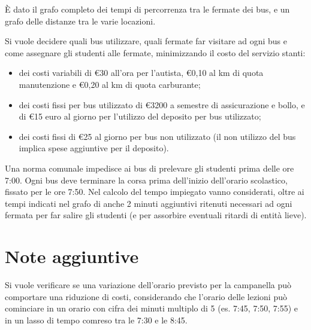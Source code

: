 È dato il grafo completo dei tempi di percorrenza tra le fermate dei bus, e un grafo delle distanze tra le varie locazioni.

 Si vuole decidere quali bus utilizzare, quali fermate far visitare ad ogni bus e come assegnare gli studenti alle fermate, minimizzando il costo del servizio stanti:

\begin{itemize}
 \item dei costi variabili di €30 all'ora per l'autista, €0,10 al km di quota manutenzione e €0,20 al km di quota carburante;
 \item dei costi fissi per bus utilizzato di €3200 a semestre di assicurazione e bollo, e di €15 euro al giorno per l'utilizzo del deposito per bus utilizzato;
 \item dei costi fissi di €25 al giorno per bus non utilizzato (il non utilizzo del bus implica spese aggiuntive per il deposito).
\end{itemize}
 Una norma comunale impedisce ai bus di prelevare gli studenti prima delle ore 7:00. Ogni bus deve terminare la corsa prima dell'inizio dell'orario scolastico, fissato per le ore 7:50. Nel calcolo del tempo impiegato vanno considerati, oltre ai tempi indicati nel grafo di %
anche 2 minuti aggiuntivi ritenuti necessari ad ogni fermata per far salire gli studenti (e per assorbire eventuali ritardi di entità lieve).

\section{Note aggiuntive}
 Si vuole verificare se una variazione dell'orario previsto per la campanella può comportare una riduzione di costi, considerando che l'orario delle lezioni può cominciare in un orario con cifra dei minuti multiplo di 5 (es. 7:45, 7:50, 7:55) e in un lasso di tempo comreso tra le 7:30 e le 8:45.